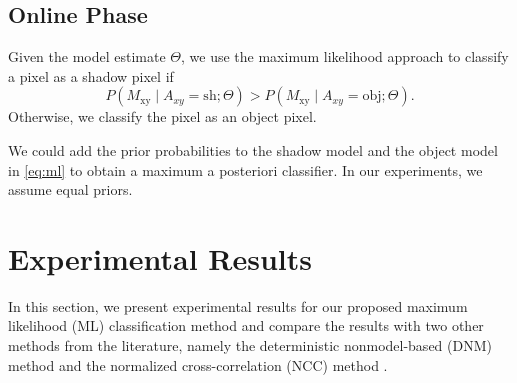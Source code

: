 \subsection{Online Phase}

Given the model estimate $\Theta$, we use the maximum likelihood
approach to classify a pixel as a shadow pixel if
\begin{equation}
  \label{eq:ml}
  P(M_{\text{xy}} \mid A_{xy}=\text{sh} ; \Theta ) >
  P(M_{\text{xy}} \mid A_{xy}=\text{obj} ; \Theta ).
\end{equation}
Otherwise, we classify the pixel as an object pixel.

We could add the prior probabilities to the shadow model and the
object model in \ref{eq:ml} to obtain a maximum a posteriori
classifier. In our experiments, we assume equal priors.

\section{Experimental Results}
\label{sec:shadow-results}

In this section, we present experimental results for our proposed
maximum likelihood (ML) classification method and compare the results
with two other methods from the literature, namely the deterministic
nonmodel-based (DNM)
method  and the normalized
cross-correlation (NCC)
method .

